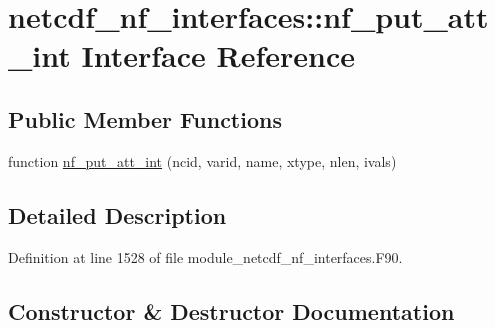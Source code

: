 \hypertarget{interfacenetcdf__nf__interfaces_1_1nf__put__att__int}{}\section{netcdf\+\_\+nf\+\_\+interfaces\+:\+:nf\+\_\+put\+\_\+att\+\_\+int Interface Reference}
\label{interfacenetcdf__nf__interfaces_1_1nf__put__att__int}
\subsection*{Public Member Functions}
\begin{DoxyCompactItemize}
\item 
function \hyperlink{interfacenetcdf__nf__interfaces_1_1nf__put__att__int_a5c9b958d4b46643edc5041c9f362a4cd}{nf\+\_\+put\+\_\+att\+\_\+int} (ncid, varid, name, xtype, nlen, ivals)
\end{DoxyCompactItemize}


\subsection{Detailed Description}


Definition at line 1528 of file module\+\_\+netcdf\+\_\+nf\+\_\+interfaces.\+F90.



\subsection{Constructor \& Destructor Documentation}
\mbox{\label{interfacenetcdf__nf__interfaces_1_1nf__put__att__int_a5c9b958d4b46643edc5041c9f362a4cd}} 
